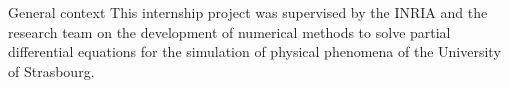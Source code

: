 \begin{frame}{General context}
    This internship project was supervised by the INRIA and the research team on the
    development of numerical methods to solve partial differential equations
    for the simulation of physical phenomena of the University of Strasbourg.

    


\end{frame}